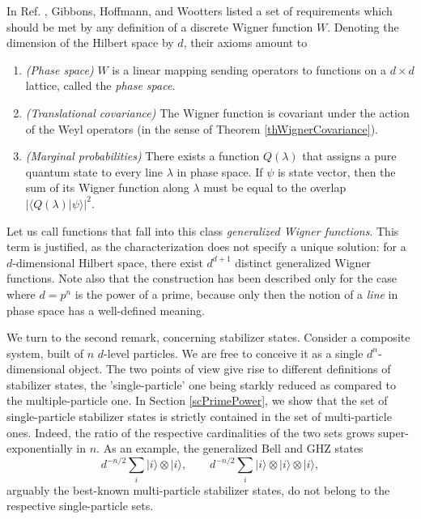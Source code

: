 \documentclass[aps,twocolumn,floatfix]{revtex4}
\def\ket#1.{|#1\rangle}
\def\braket#1,#2.{\langle#1|#2\rangle}
\begin{document}
In Ref. \cite{wootters}, Gibbons, Hoffmann, and Wootters listed a set
of requirements which should be met by any definition of a discrete
Wigner function $W$. Denoting the dimension of the Hilbert space by
$d$, their axioms amount to
\begin{enumerate}
	\item \emph{(Phase space)}
	$W$ is a linear mapping sending operators to functions on a
	$d\times d$ lattice, called the \emph{phase space}.

	\item
	\emph{(Translational covariance)}
	The Wigner function is covariant under the action of the Weyl
	operators (in the sense of Theorem \ref{thWignerCovariance}).

	\item \emph{(Marginal probabilities)}
	There exists a function $Q(\lambda)$ that assigns a pure quantum
	state to every line $\lambda$ in phase space. If $\psi$ is state
	vector, then the sum of its Wigner function along $\lambda$ must be
	equal to the overlap $|\braket Q(\lambda), \psi.|^2$.
\end{enumerate}
Let us call functions that fall into this class \emph{generalized
Wigner functions}. This term is justified, as the
characterization does not specify a unique solution: for a
$d$-dimensional Hilbert space, there exist $d^{d+1}$ distinct
generalized Wigner functions. Note also that the construction has been
described only for the case where $d=p^n$ is the power of a prime,
because only then the notion of a \emph{line} in phase space has a
well-defined meaning. 

We turn to the second remark, concerning stabilizer states.
Consider a composite system, built of $n$ $d$-level particles. We
are free to conceive it as a single $d^n$-dimensional object.  The two
points of view give rise to different definitions of stabilizer
states, the 'single-particle' one being starkly reduced as compared to
the multiple-particle one. In Section \ref{scPrimePower}, we show that
the set of single-particle stabilizer states is strictly contained in
the set of multi-particle ones. Indeed, the ratio of the respective
cardinalities of the two sets grows super-exponentially in $n$. 
As an example, the generalized Bell and GHZ states
\begin{equation*}
	d^{-n/2}\sum_i \ket i.\otimes\ket i.,
	\quad\quad 
	d^{-n/2}\sum_i \ket i.\otimes\ket i.\otimes \ket i.,
\end{equation*}
arguably the best-known multi-particle stabilizer states, do not belong to 
the respective single-particle sets.
\end{document}
